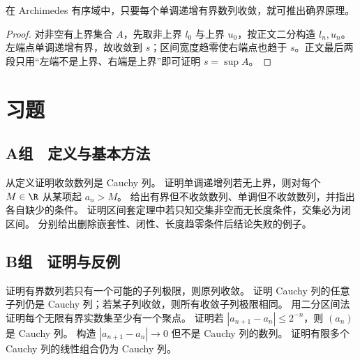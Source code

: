 \begin{proposition}
在 Archimedes 有序域中，只要每个单调递增有界数列收敛，就可推出确界原理。
\end{proposition}

\begin{proof}
对非空有上界集合 \(A\)，先取非上界 \(l_0\) 与上界 \(u_0\)，按正文二分构造 \(l_n,u_n\)。左端点单调递增有界，故收敛到 \(s\)；区间宽度趋零使右端点也趋于 \(s\)。正文最后两段只用“左端不是上界、右端是上界”即可证明 \(s=\sup A\)。
\end{proof}

\section*{习题}

\subsection*{A组　定义与基本方法}
\begin{enumerate}[label=\textbf{\thechapter.\arabic*.}]
  从定义证明收敛数列是 Cauchy 列。
  证明单调递增列若无上界，则对每个 \(M\in\R\) 从某项起 \(a_n>M\)。
  给出有界但不收敛数列、单调但不收敛数列，并指出各自缺少的条件。
  证明区间套定理中若只知交集非空而无长度条件，交集必为闭区间。
  分别给出删除嵌套性、闭性、长度趋零条件后结论失败的例子。
\end{enumerate}

\subsection*{B组　证明与反例}
\begin{enumerate}[label=\textbf{\thechapter.\arabic*.},resume]
  证明有界数列若只有一个可能的子列极限，则原列收敛。
  证明 Cauchy 列的任意子列仍是 Cauchy 列；若某子列收敛，则所有收敛子列极限相同。
  用二分区间法证明每个无限有界实数集至少有一个聚点。
  证明若 \(|a_{n+1}-a_n|\le2^{-n}\)，则 \((a_n)\) 是 Cauchy 列。
  构造 \(|a_{n+1}-a_n|\to0\) 但不是 Cauchy 列的数列。
  证明有限多个 Cauchy 列的线性组合仍为 Cauchy 列。
\end{enumerate}

